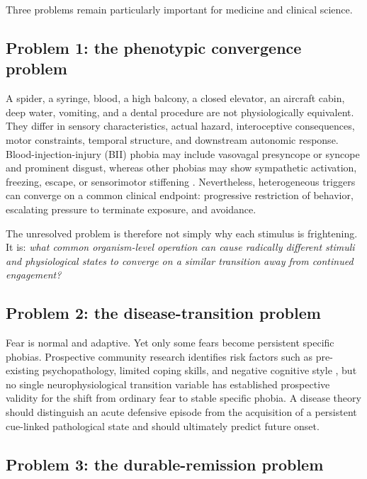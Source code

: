 \documentclass[11pt]{article}
\begin{document}
Three problems remain particularly important for medicine and clinical science.

\subsection{Problem 1: the phenotypic convergence problem}

A spider, a syringe, blood, a high balcony, a closed elevator, an aircraft cabin, deep water, vomiting, and a dental procedure are not physiologically equivalent. They differ in sensory characteristics, actual hazard, interoceptive consequences, motor constraints, temporal structure, and downstream autonomic response. Blood-injection-injury (BII) phobia may include vasovagal presyncope or syncope and prominent disgust, whereas other phobias may show sympathetic activation, freezing, escape, or sensorimotor stiffening \cite{ducasse2013,ritz2010}. Nevertheless, heterogeneous triggers can converge on a common clinical endpoint: progressive restriction of behavior, escalating pressure to terminate exposure, and avoidance.

The unresolved problem is therefore not simply why each stimulus is frightening. It is: \emph{what common organism-level operation can cause radically different stimuli and physiological states to converge on a similar transition away from continued engagement?}

\subsection{Problem 2: the disease-transition problem}

Fear is normal and adaptive. Yet only some fears become persistent specific phobias. Prospective community research identifies risk factors such as pre-existing psychopathology, limited coping skills, and negative cognitive style \cite{trumpf2010incidence}, but no single neurophysiological transition variable has established prospective validity for the shift from ordinary fear to stable specific phobia. A disease theory should distinguish an acute defensive episode from the acquisition of a persistent cue-linked pathological state and should ultimately predict future onset.

\subsection{Problem 3: the durable-remission problem}
\end{document}
